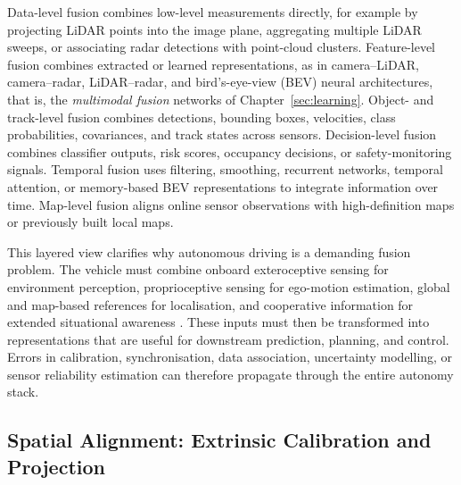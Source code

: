 \documentclass[graybox,envcountchap]{style/SNmono}
\begin{document}
Data-level fusion combines low-level measurements directly, for example by projecting LiDAR points into the image plane, aggregating multiple LiDAR sweeps, or associating radar detections with point-cloud clusters. Feature-level fusion combines extracted or learned representations, as in camera--LiDAR, camera--radar, LiDAR--radar, and bird's-eye-view (BEV) neural architectures, that is, the \emph{multimodal fusion} networks of Chapter~\ref{sec:learning}. Object- and track-level fusion combines detections, bounding boxes, velocities, class probabilities, covariances, and track states across sensors. Decision-level fusion combines classifier outputs, risk scores, occupancy decisions, or safety-monitoring signals. Temporal fusion uses filtering, smoothing, recurrent networks, temporal attention, or memory-based BEV representations to integrate information over time. Map-level fusion aligns online sensor observations with high-definition maps or previously built local maps.

This layered view clarifies why autonomous driving is a demanding fusion problem. The vehicle must combine onboard exteroceptive sensing for environment perception, proprioceptive sensing for ego-motion estimation, global and map-based references for localisation, and cooperative information for extended situational awareness \cite{2023:IEEE_ITSM,TANG2023109165}. These inputs must then be transformed into representations that are useful for downstream prediction, planning, and control. Errors in calibration, synchronisation, data association, uncertainty modelling, or sensor reliability estimation can therefore propagate through the entire autonomy stack.

\subsection{Spatial Alignment: Extrinsic Calibration and Projection}
\label{subsec:spatial-alignment}
\end{document}
